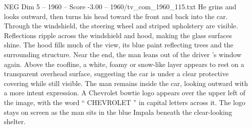 \begin{textsample}{NEG Dim 5 – 1960 – Score -3.00 – 1960/tv\_com\_1960\_115.txt}
He grins and looks outward, then turns his head toward the front and back into the car.
Through the windshield, the steering wheel and striped upholstery are visible.
Reflections ripple across the windshield and hood, making the glass surfaces shine.
The hood fills much of the view, its blue paint reflecting trees and the surrounding structure.
Near the end, the man leans out of the driver ’s window again.
Above the roofline, a white, foamy or snow-like layer appears to rest on a transparent overhead surface, suggesting the car is under a clear protective covering while still visible.
The man remains inside the car, looking outward with a more intent expression.
A Chevrolet bowtie logo appears over the upper left of the image, with the word “ CHEVROLET ” in capital letters across it.
The logo stays on screen as the man sits in the blue Impala beneath the clear-looking shelter.

\end{textsample}
